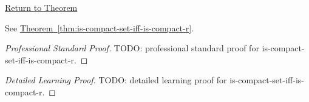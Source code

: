 \newpage
{}
\label{prf:is-compact-set-iff-is-compact-r}

\begin{remark*}[Return]
\hyperref[thm:is-compact-set-iff-is-compact-r]{Return to Theorem}
\end{remark*}

\begin{theorem*}
See \hyperref[thm:is-compact-set-iff-is-compact-r]{Theorem~\ref*{thm:is-compact-set-iff-is-compact-r}}.
\end{theorem*}

\begin{proof}[Professional Standard Proof]
\LRAProofBodyStart
TODO: professional standard proof for is-compact-set-iff-is-compact-r.
\end{proof}

\begin{proof}[Detailed Learning Proof]
\LRAProofBodyStart
TODO: detailed learning proof for is-compact-set-iff-is-compact-r.
\end{proof}

\begin{remark*}
\end{remark*}

\begin{dependencies}
\NoLocalDependencies
\end{dependencies}

\clearpage

